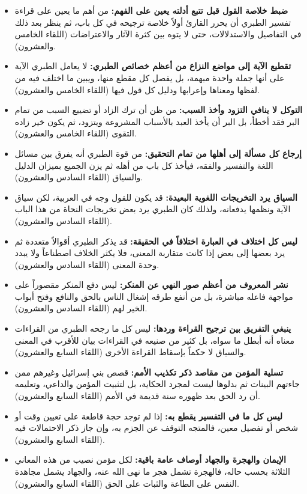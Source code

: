 \begin{itemize}
    \item \textbf{ضبط خلاصة القول قبل تتبع أدلته يعين على الفهم:} من أهم ما يعين على قراءة تفسير الطبري أن يحرر القارئ أولاً خلاصة ترجيحه في كل باب، ثم ينظر بعد ذلك في التفاصيل والاستدلالات، حتى لا يتوه بين كثرة الآثار والاعتراضات (اللقاء الخامس والعشرون).
    \item \textbf{تقطيع الآية إلى مواضع النزاع من أعظم خصائص الطبري:} لا يعامل الطبري الآية على أنها جملة واحدة مبهمة، بل يفصل كل مقطع منها، ويبين ما اختلف فيه من لفظها ومعناها وإعرابها ودليل كل قول فيها (اللقاء الخامس والعشرون).
    \item \textbf{التوكل لا ينافي التزود وأخذ السبب:} من ظن أن ترك الزاد أو تضييع السبب من تمام البر فقد أخطأ، بل البر أن يأخذ العبد بالأسباب المشروعة ويتزود، ثم يكون خير زاده التقوى (اللقاء الخامس والعشرون).
    \item \textbf{إرجاع كل مسألة إلى أهلها من تمام التحقيق:} من قوة الطبري أنه يفرق بين مسائل اللغة والتفسير والفقه، فيأخذ كل باب من أهله ثم يزن الجميع بميزان الدليل والسياق (اللقاء السادس والعشرون).
    \item \textbf{السياق يرد التخريجات اللغوية البعيدة:} قد يكون للقول وجه في العربية، لكن سياق الآية ونظمها يدفعانه، ولذلك كان الطبري يرد بعض تخريجات النحاة من هذا الباب (اللقاء السادس والعشرون).
    \item \textbf{ليس كل اختلاف في العبارة اختلافاً في الحقيقة:} قد يذكر الطبري أقوالاً متعددة ثم يرد بعضها إلى بعض إذا كانت متقاربة المعنى، فلا يكثر الخلاف اصطناعاً ولا يبدد وحدة المعنى (اللقاء السادس والعشرون).
    \item \textbf{نشر المعروف من أعظم صور النهي عن المنكر:} ليس دفع المنكر مقصوراً على مواجهة فاعله مباشرة، بل من أنفع طرقه إشغال الناس بالحق والنافع وفتح أبواب الخير لهم (اللقاء السادس والعشرون).
    \item \textbf{ينبغي التفريق بين ترجيح القراءة وردها:} ليس كل ما رجحه الطبري من القراءات معناه أنه أبطل ما سواه، بل كثير من صنيعه في القراءات بيان للأقرب في المعنى والسياق لا حكماً بإسقاط القراءة الأخرى (اللقاء السابع والعشرون).
    \item \textbf{تسلية المؤمن من مقاصد ذكر تكذيب الأمم:} قصص بني إسرائيل وغيرهم ممن جاءتهم البينات ثم بدلوها ليست لمجرد الحكاية، بل لتثبيت المؤمن والداعي، وتعليمه أن رد الحق بعد ظهوره سنة قديمة في الأمم (اللقاء السابع والعشرون).
    \item \textbf{ليس كل ما في التفسير يقطع به:} إذا لم توجد حجة قاطعة على تعيين وقت أو شخص أو تفصيل معين، فالمتجه التوقف عن الجزم به، وإن جاز ذكر الاحتمالات فيه (اللقاء السابع والعشرون).
    \item \textbf{الإيمان والهجرة والجهاد أوصاف عامة باقية:} لكل مؤمن نصيب من هذه المعاني الثلاثة بحسب حاله، فالهجرة تشمل هجر ما نهى الله عنه، والجهاد يشمل مجاهدة النفس على الطاعة والثبات على الحق (اللقاء السابع والعشرون).

\end{itemize}
